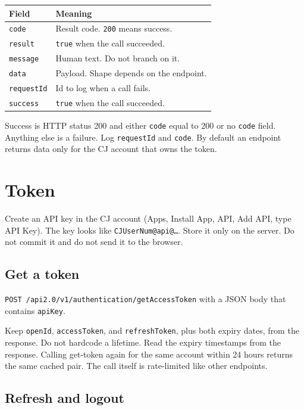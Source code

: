 \documentclass[11pt]{article}
\begin{document}
\begin{center}
\begin{tabular}{@{}ll@{}}
\toprule
Field & Meaning \\
\midrule
\texttt{code} & Result code. \texttt{200} means success. \\
\texttt{result} & \texttt{true} when the call succeeded. \\
\texttt{message} & Human text. Do not branch on it. \\
\texttt{data} & Payload. Shape depends on the endpoint. \\
\texttt{requestId} & Id to log when a call fails. \\
\texttt{success} & \texttt{true} when the call succeeded. \\
\bottomrule
\end{tabular}
\end{center}

Success is HTTP status 200 and either \texttt{code} equal to 200 or no \texttt{code} field. Anything else is a failure. Log \texttt{requestId} and \texttt{code}. By default an endpoint returns data only for the CJ account that owns the token.

\section{Token}

Create an API key in the CJ account (Apps, Install App, API, Add API, type API Key). The key looks like \texttt{CJUserNum@api@\ldots}. Store it only on the server. Do not commit it and do not send it to the browser.

\subsection{Get a token}

\texttt{POST /api2.0/v1/authentication/getAccessToken} with a JSON body that contains \texttt{apiKey}.

Keep \texttt{openId}, \texttt{accessToken}, and \texttt{refreshToken}, plus both expiry dates, from the response. Do not hardcode a lifetime. Read the expiry timestamps from the response. Calling get-token again for the same account within 24 hours returns the same cached pair. The call itself is rate-limited like other endpoints.

\subsection{Refresh and logout}
\end{document}
